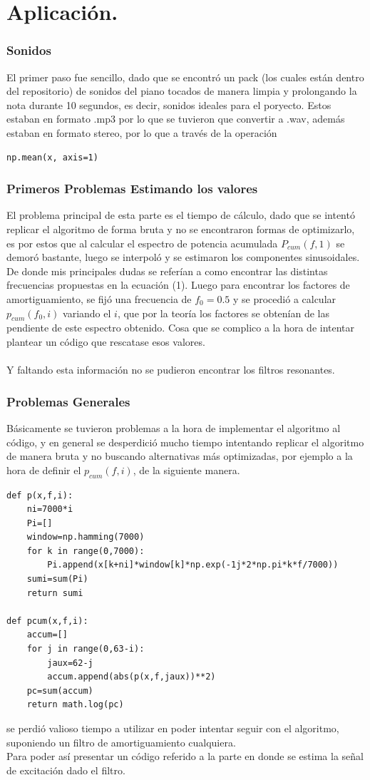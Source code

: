 \documentclass[11pt]{amsart}
\theoremstyle{plain}
\theoremstyle{definition}
\begin{document}
\section{Aplicación.}
\subsubsection{Sonidos}
El primer paso fue sencillo, dado que se encontró un pack (los cuales están dentro del repositorio) de sonidos del piano tocados de manera limpia y prolongando la nota durante 10 segundos, es decir, sonidos ideales para el poryecto. Estos estaban en formato .mp3 por lo que se tuvieron que convertir a .wav, además estaban en formato stereo, por lo que a través de la operación
\begin{verbatim}
np.mean(x, axis=1)
\end{verbatim}
\subsubsection{Primeros Problemas Estimando los valores}
El problema principal de esta parte es el tiempo de cálculo, dado que se intentó replicar el algoritmo de forma bruta y no se encontraron formas de optimizarlo, es por estos que al calcular el espectro de potencia acumulada $P_{cum}(f,1)$ se demoró bastante, luego se interpoló y se estimaron los componentes sinusoidales. De donde mis principales dudas se referían a como encontrar las distintas frecuencias propuestas en la ecuación (1). Luego para encontrar los factores de amortiguamiento, se fijó una frecuencia de $f_0=0.5$ y se procedió a calcular $p_{cum}(f_0,i)$ variando el $i$, que por la teoría los factores se obtenían de las pendiente de este espectro obtenido. Cosa que se complico a la hora de intentar plantear un código que rescatase esos valores. \\ \\
Y faltando esta información no se pudieron encontrar los filtros resonantes.
\subsubsection{Problemas Generales}
Básicamente se tuvieron problemas a la hora de implementar el algoritmo al código, y en general se desperdició mucho tiempo intentando replicar el algoritmo de manera bruta y no buscando alternativas más optimizadas, por ejemplo a la hora de definir el $p_{cum}(f,i)$, de la siguiente manera.
\begin{verbatim}
def p(x,f,i):
    ni=7000*i
    Pi=[]
    window=np.hamming(7000)
    for k in range(0,7000):
        Pi.append(x[k+ni]*window[k]*np.exp(-1j*2*np.pi*k*f/7000))
    sumi=sum(Pi)
    return sumi

def pcum(x,f,i):
    accum=[]
    for j in range(0,63-i):
        jaux=62-j
        accum.append(abs(p(x,f,jaux))**2)
    pc=sum(accum)
    return math.log(pc)    
\end{verbatim}
se perdió valioso tiempo a utilizar en poder intentar seguir con el algoritmo, suponiendo un filtro de amortiguamiento cualquiera. \\
Para poder así presentar un código referido a la parte en donde se estima la señal de excitación dado el filtro. \\ 
\end{document}
